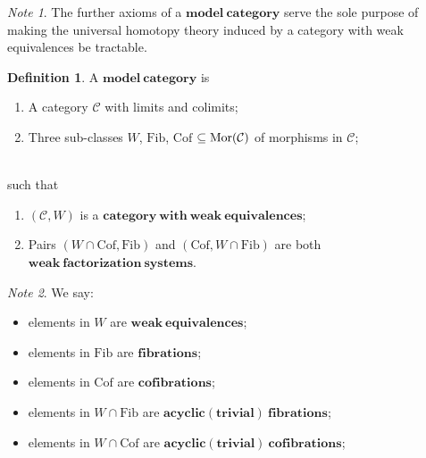 \documentclass[a4paper]{article}
\theoremstyle{plain}
\theoremstyle{definition}
\newtheorem{defn}{Definition}[section]
\theoremstyle{remark}
\newtheorem*{note}{Note}
\newcommand{\mc}[1]{\mathcal{#1}}
\newcommand{\mbf}[1]{\mathbf{#1}}
\newcommand{\mcC}{\mc C}
\DeclareMathOperator{\Mor}{\rm{Mor}}
\newcommand{\Cof}{\mathrm{Cof}}
\newcommand{\Fib}{\mathrm{Fib}}
\begin{document}
    \begin{note}
        The further axioms of a $\mbf{model\ category}$ serve the sole purpose of
        making the universal homotopy theory induced by
        a category with weak equivalences be tractable.

    \end{note}

    \begin{defn}
        A $\mbf{model\ category}$ is
        \begin{enumerate}
            \item A category $\mcC$ with limits and colimits;
            \item Three sub-classes $W$, $\Fib$, $\Cof$ $ \subseteq \Mor(\mcC)$ of morphisms in $\mcC$;
        \end{enumerate}
        \ \\
        such that
        \begin{enumerate}
            \item $(\mcC, W)$ is a $\mbf{category\ with\ weak\ equivalences}$;
            \item Pairs $(W \cap \Cof, \Fib)$ and $(\Cof, W \cap \Fib)$ are both
            $\mbf{weak\ factorization\ systems}$.
        \end{enumerate}

    \end{defn}

    \begin{note}
        We say:
        \begin{itemize}
            \item elements in $W$ are $\mbf{weak\ equivalences}$;
            \item elements in $\Fib$ are $\mbf{fibrations}$;
            \item elements in $\Cof$ are $\mbf{cofibrations}$;
            \item elements in $W \cap \Fib$ are $\mbf{acyclic(trivial)\ fibrations}$;
            \item elements in $W \cap \Cof$ are $\mbf{acyclic(trivial)\ cofibrations}$;
        \end{itemize}

    \end{note}
\end{document}
